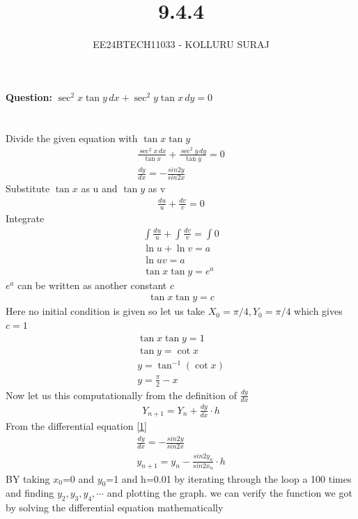 \documentclass[journal]{IEEEtran}
\numberwithin{equation}{enumi}
\numberwithin{figure}{enumi}
\begin{document}

\title{9.4.4}
\author{EE24BTECH11033 - KOLLURU SURAJ}
{\let\newpage\relax\maketitle}
\textbf{Question:} 
$\sec^2 x \tan y \, dx + \sec^2 y \tan x \, dy = 0$
\\\\
\solution\\
Divide the given equation with $\tan x \tan y$
\begin{align}
    \frac{\sec^2 x \, dx}{\tan x} + \frac{\sec^2 y \, dy}{\tan y} = 0\\
    \frac{dy}{dx}=-\frac{sin2y}{sin2x}\label{1}
\end{align}
Substitute $\tan x$ as u and $\tan y$ as v
\begin{align}
    \frac{du}{u} + \frac{dv}{v} = 0
\end{align}
Integrate
\begin{align}
\int  \frac{du}{u} + \int \frac{dv}{v} = \int 0\\
    \ln u + \ln v = a\\
    \ln uv = a\\
    \tan x \tan y = e^a
\end{align}
 $e^a$ can be written as another constant $c$
 \begin{align}
      \tan x \tan y = c
 \end{align}
Here no initial condition is given so let us take $X_{0}=\pi/4,Y_{0}=\pi/4$ which gives $c=1$
\begin{align}
    \tan x \tan y = 1\\
    \tan y = \cot x\\
    y = \tan^{-1}(\cot x)\\
    y= \frac{\pi}{2}- x
\end{align}
Now let us  this computationally from the definition of $\frac{dy}{dx}$ 
\begin{align}
    Y_{n+1}=Y_n+\frac{dy}{dx}\cdot h
\end{align}
From the differential equation \ref{1}
\begin{align}
    \frac{dy}{dx}=-\frac{sin2y}{sin2x}\\
    y_{n+1}=y_n-\frac{sin2y_n}{sin2x_n}\cdot h
\end{align}
BY taking $x_0$=0 and $y_0$=1 and h=0.01  by iterating through the loop a 100 times and finding $y_2,y_3,y_4,\cdots$ and plotting the graph. we can verify the function we got by solving the differential equation mathematically
\end{document}
